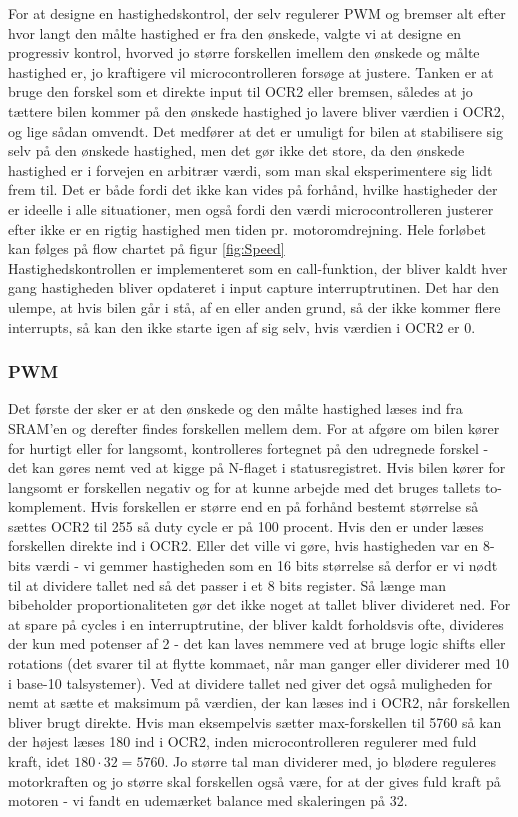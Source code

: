 For at designe en hastighedskontrol, der selv regulerer PWM og bremser alt efter hvor langt den målte hastighed er fra den ønskede, valgte vi at designe en progressiv kontrol, hvorved jo større forskellen imellem den ønskede og målte hastighed er, jo kraftigere vil microcontrolleren forsøge at justere. Tanken er at bruge den forskel som et direkte input til OCR2 eller bremsen, således at jo tættere bilen kommer på den ønskede hastighed jo lavere bliver værdien i OCR2, og lige sådan omvendt. Det medfører at det er umuligt for bilen at stabilisere sig selv på den ønskede hastighed, men det gør ikke det store, da den ønskede hastighed er i forvejen en arbitrær værdi, som man skal eksperimentere sig lidt frem til. Det er både fordi det ikke kan vides på forhånd, hvilke hastigheder der er ideelle i alle situationer, men også fordi den værdi microcontrolleren justerer efter ikke er en rigtig hastighed men tiden pr. motoromdrejning. Hele forløbet kan følges på flow chartet på figur \ref{fig:Speed}\\
Hastighedskontrollen er implementeret som en call-funktion, der bliver kaldt hver gang hastigheden bliver opdateret i input capture interruptrutinen. Det har den ulempe, at hvis bilen går i stå, af en eller anden grund, så der ikke kommer flere interrupts, så kan den ikke starte igen af sig selv, hvis værdien i OCR2 er 0. \\
\subsubsection{PWM}
Det første der sker er at den ønskede og den målte hastighed læses ind fra SRAM'en og derefter findes forskellen mellem dem. For at afgøre om bilen kører for hurtigt eller for langsomt, kontrolleres fortegnet på den udregnede forskel - det kan gøres nemt ved at kigge på N-flaget i statusregistret. Hvis bilen kører for langsomt er forskellen negativ og for at kunne arbejde med det bruges tallets to-komplement. Hvis forskellen er større end en på forhånd bestemt størrelse så sættes OCR2 til 255 så duty cycle er på 100 procent. Hvis den er under læses forskellen direkte ind i OCR2. Eller det ville vi gøre, hvis hastigheden var en 8-bits værdi - vi gemmer hastigheden som en 16 bits størrelse så derfor er vi nødt til at dividere tallet ned så det passer i et 8 bits register. Så længe man bibeholder proportionaliteten gør det ikke noget at tallet bliver divideret ned. For at spare på cycles i en interruptrutine, der bliver kaldt forholdsvis ofte, divideres der kun med potenser af 2 - det kan laves nemmere ved at bruge logic shifts eller rotations (det svarer til at flytte kommaet, når man ganger eller dividerer med 10 i base-10 talsystemer). Ved at dividere tallet ned giver det også muligheden for nemt at sætte et maksimum på værdien, der kan læses ind i OCR2, når forskellen bliver brugt direkte. Hvis man eksempelvis sætter max-forskellen til 5760 så kan der højest læses 180 ind i OCR2, inden microcontrolleren regulerer med fuld kraft, idet $180 \cdot 32 = 5760$. Jo større tal man dividerer med, jo blødere reguleres motorkraften og jo større skal forskellen også være, for at der gives fuld kraft på motoren - vi fandt en udemærket balance med skaleringen på 32.\\


